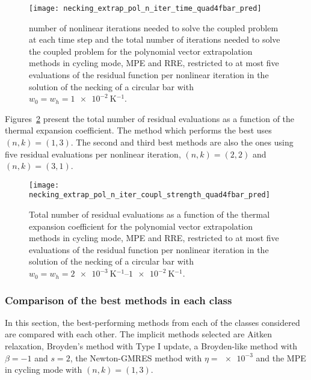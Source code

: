 \begin{figure}[htbp]
 \centering
 \texttt{[image: necking\_extrap\_pol\_n\_iter\_time\_quad4fbar\_pred]}
 \caption{number of nonlinear iterations needed to solve the coupled problem at each time step and the total number of iterations needed to solve the coupled problem for the polynomial vector extrapolation methods in cycling mode, MPE and RRE, restricted to at most five evaluations of the residual function per nonlinear iteration in the solution of the necking of a circular bar with \(w_0=w_h=\SI{1e-2}{\kelvin^{-1}}\).}
\label{fig:necking_extrap_pol_n_iter_time_quad4fbar_pred}
\end{figure}

Figures~\ref{fig:necking_extrap_pol_n_iter_coupl_strength_quad4fbar_pred} present the total number of residual evaluations as a function of the thermal expansion coefficient.
The method which performs the best uses \((n,k)=(1,3)\).
The second and third best methods are also the ones using five residual evaluations per nonlinear iteration, \((n,k)=(2,2)\) and \((n,k)=(3,1)\).

\begin{figure}[htbp]
 \centering
 \texttt{[image: necking\_extrap\_pol\_n\_iter\_coupl\_strength\_quad4fbar\_pred]}
 \caption{Total number of residual evaluations as a function of the thermal expansion coefficient for the polynomial vector extrapolation methods in cycling mode, MPE and RRE, restricted to at most five evaluations of the residual function per nonlinear iteration in the solution of the necking of a circular bar with \(w_0=w_h=\SIrange{2e-3}{1e-2}{\kelvin^{-1}}\).}
\label{fig:necking_extrap_pol_n_iter_coupl_strength_quad4fbar_pred}
\end{figure}

\FloatBarrier

\subsubsection{Comparison of the best methods in each class}

In this section, the best-performing methods from each of the classes considered are compared with each other.
The implicit methods selected are Aitken relaxation, Broyden's method with Type I update, a Broyden-like method with \(\beta=-1\) and \(s=2\), the Newton-GMRES method with \(\eta=\num{e-3}\) and the MPE in cycling mode with \((n,k)=(1,3)\).

